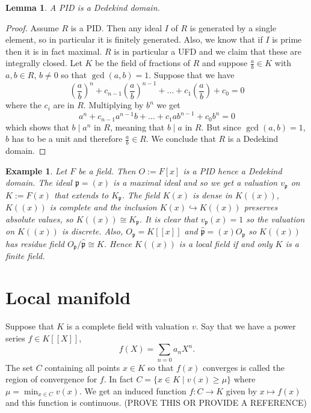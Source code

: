 \documentclass{article}
\newtheorem{lemma}{Lemma}[section]
\newtheorem{example}{Example}[section]
\newcommand{\mfrak}[1]{\mathfrak{#1}}
\newcommand{\vp}{{v_{\mfrak p}}}
\begin{document}
 
\begin{lemma}
    A PID is a Dedekind domain.
\end{lemma}
\begin{proof}
    Assume $R$ is a PID. Then any ideal $I$ of $R$ is generated by a single element, so in particular it is finitely generated. Also, we know that if $I$ is prime then it is in fact maximal. $R$ is in particular a UFD and we claim that these are integrally closed. Let $K$ be the field of fractions of $R$ and suppose $\frac{a}{b} \in K$ with $a,b \in R$, $b \neq 0$ so that $\gcd(a, b) = 1$. Suppose that we have
    $$(\frac{a}{b})^n + c_{n-1}(\frac{a}{b})^{n-1} + ... + c_{1}(\frac{a}{b}) + c_0 = 0$$
    where the $c_i$ are in $R$. Multiplying by $b^n$ we get
    $$a^n + c_{n-1}a^{n-1}b + ... + c_{1}ab^{n-1} + c_0 b^n = 0$$
    which shows that $b \mid a^n$ in $R$, meaning that $b \mid a$ in $R$. But since $\gcd(a,b) = 1$, $b$ has to be a unit and therefore $\frac{a}{b} \in R$. We conclude that $R$ is a Dedekind domain. 
\end{proof}


\begin{example}
    Let $F$ be a field. Then $O := F[x]$ is a PID hence a Dedekind domain. The ideal $\mfrak p = (x)$ is a maximal ideal and so we get a valuation $v_\mfrak p$ on $K := F(x)$ that extends to $K_\mfrak p$. The field $K(x)$ is dense in $K((x))$, $K((x))$ is complete and the inclusion $K(x) \hookrightarrow K((x))$ preserves absolute values, so $K((x)) \cong K_\mfrak p$. It is clear that $\vp(x) = 1$ so the valuation on $K((x))$ is discrete. Also, $O_\mfrak p = K[[x]]$ and $\hat {\mfrak p} = (x)O_\mfrak p$ so $K((x))$ has residue field $O_\mfrak p / \hat {\mfrak p} \cong K$. Hence $K((x))$ is a local field if and only $K$ is a finite field. 
\end{example}



\section{Local manifold}

Suppose that $K$ is a complete field with valuation $v$. Say that we have a power series $f \in K[[X]]$,  
$$f(X) = \sum_{n = 0} a_n X^n.$$
The set $C$ containing all points $x \in K$ so that $f(x)$ converges is called the region of convergence for $f$. In fact $C = \{x \in K \mid v(x) \geq \mu \}$ where $\mu = \min_{x \in C} v(x)$. We get an induced function $f : C \to K$ given by $x \mapsto f(x)$ and this function is continuous. (PROVE THIS OR PROVIDE A REFERENCE) 
\end{document}
